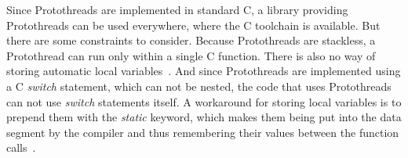 Since Protothreads are implemented in standard C, a library providing Protothreads can be used everywhere,
where the C toolchain is available.
But there are some constraints to consider.
Because Protothreads are stackless, a Protothread can run only within a single C function.
There is also no way of storing automatic local variables~\cite{contiki-docs}.
And since Protothreads are implemented using a C {\it switch} statement, which can
not be nested, the code that uses Protothreads can not use {\it switch} statements itself.
A workaround for storing local variables is to prepend them with the {\it static} keyword,
which makes them being put into the data segment
by the compiler and thus remembering their values between the function calls~\cite{paper-protothreads}.
